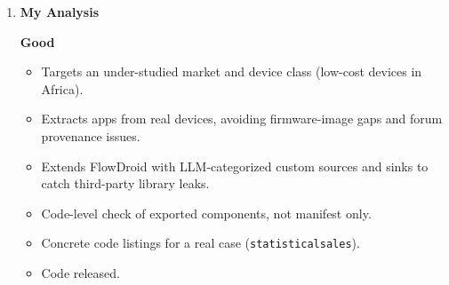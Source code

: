 \documentclass[11pt,a4paper]{article}
\newcommand{\entrypart}[1]{\textbf{\color{accent}#1}\par\vspace{2pt}}
\begin{document}
\begin{enumerate}
    \vspace{4pt}
    \textbf{Note:} Further limitations are not stated by the authors; see My Analysis.

    \item \entrypart{My Analysis}

    \textbf{Good}
    \begin{itemize}[leftmargin=*,itemsep=1pt,topsep=2pt]
        \item Targets an under-studied market and device class (low-cost devices in Africa).
        \item Extracts apps from real devices, avoiding firmware-image gaps and forum provenance issues.
        \item Extends FlowDroid with LLM-categorized custom sources and sinks to catch third-party library leaks.
        \item Code-level check of exported components, not manifest only.
        \item Concrete code listings for a real case (\texttt{statisticalsales}).
        \item Code released.
    \end{itemize}


\end{enumerate}
\end{document}
